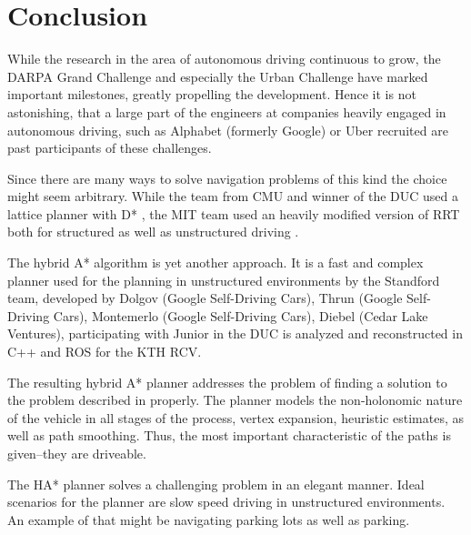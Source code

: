 \chapter{Conclusion}
While the research in the area of autonomous driving continuous to grow, the DARPA Grand Challenge and especially the Urban Challenge have marked important milestones, greatly propelling the development. Hence it is not astonishing, that a large part of the engineers at companies heavily engaged in autonomous driving, such as Alphabet (formerly Google) or Uber recruited are past participants of these challenges.

Since there are many ways to solve navigation problems of this kind the choice might seem arbitrary. While the team from CMU and winner of the DUC used a lattice planner with D* \cite{Ferguson.2008b,Likhachev.2005}, the MIT team used an heavily modified version of RRT both for structured as well as unstructured driving \cite{Kuwata.2008}.

The hybrid A* algorithm is yet another approach. It is a fast and complex planner used for the planning in unstructured environments by the Standford team, developed by Dolgov (Google Self-Driving Cars), Thrun (Google Self-Driving Cars), Montemerlo (Google Self-Driving Cars), Diebel (Cedar Lake Ventures), participating with Junior in the DUC is analyzed and reconstructed in C++ and ROS for the KTH RCV.

The resulting hybrid A* planner addresses the problem of finding a solution to the problem described in  properly. The planner models the non-holonomic nature of the vehicle in all stages of the process, vertex expansion, heuristic estimates, as well as path smoothing. Thus, the most important characteristic of the paths is given--they are driveable. 

The HA* planner solves a challenging problem in an elegant manner. Ideal scenarios for the planner are slow speed driving in unstructured environments. An example of that might be navigating parking lots as well as parking.